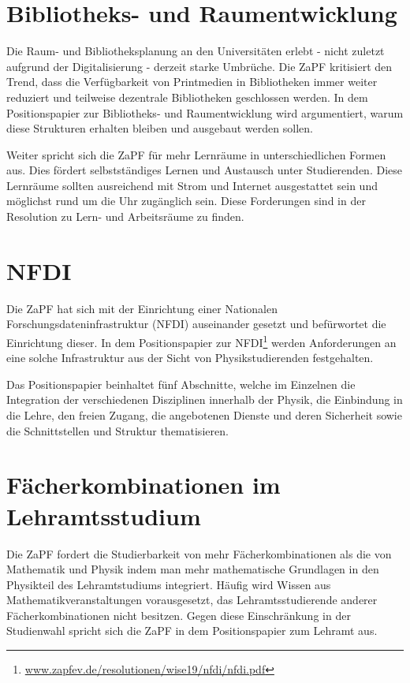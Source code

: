 \section*{Bibliotheks- und Raumentwicklung}
Die Raum- und Bibliotheksplanung an den Universitäten erlebt - nicht zuletzt aufgrund der Digitalisierung - derzeit starke Umbrüche. Die ZaPF kritisiert den Trend, dass die Verfügbarkeit von Printmedien in Bibliotheken immer weiter reduziert und teilweise dezentrale Bibliotheken geschlossen werden. In dem Positionspapier zur Bibliotheks- und Raumentwicklung wird argumentiert, warum diese Strukturen erhalten bleiben und ausgebaut werden sollen.

Weiter spricht sich die ZaPF für mehr Lernräume in unterschiedlichen Formen aus. Dies fördert selbstständiges Lernen und Austausch unter Studierenden. Diese Lernräume sollten ausreichend mit Strom und Internet ausgestattet sein und möglichst rund um die Uhr zugänglich sein. Diese Forderungen sind in der Resolution zu Lern- und Arbeitsräume zu finden.

\section*{NFDI}
Die ZaPF hat sich mit der Einrichtung einer Nationalen Forschungsdateninfrastruktur (NFDI) auseinander gesetzt und befürwortet die Einrichtung dieser. In dem Positionspapier zur NFDI\footnote{\url{www.zapfev.de/resolutionen/wise19/nfdi/nfdi.pdf}} werden Anforderungen an eine solche Infrastruktur aus der Sicht von Physikstudierenden festgehalten.

Das Positionspapier beinhaltet fünf Abschnitte, welche im Einzelnen die Integration der verschiedenen Disziplinen innerhalb der Physik, die Einbindung in die Lehre, den freien Zugang, die angebotenen Dienste und deren Sicherheit sowie die Schnittstellen und Struktur thematisieren.

\section*{Fächerkombinationen im Lehramtsstudium}
Die ZaPF fordert die Studierbarkeit von mehr Fächerkombinationen als die von Mathematik und Physik indem man mehr mathematische Grundlagen in den Physikteil des Lehramtstudiums integriert. Häufig wird Wissen aus Mathematikveranstaltungen vorausgesetzt, das Lehramtsstudierende anderer Fächerkombinationen nicht besitzen. Gegen diese Einschränkung in der Studienwahl spricht sich die ZaPF in dem Positionspapier zum Lehramt aus. 


